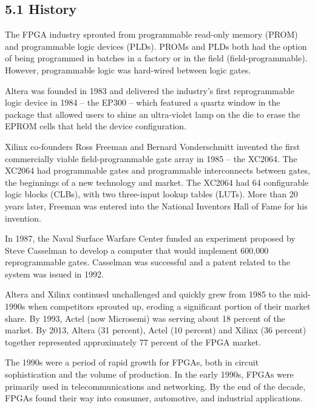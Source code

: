 \subsection*{5.1 History}
The FPGA industry sprouted from programmable read-only memory (PROM) and programmable logic devices (PLDs). PROMs and PLDs both had the option of being programmed in batches in a factory or in the field (field-programmable). However, programmable logic was hard-wired between logic gates.\vspace{.3cm}

Altera was founded in 1983 and delivered the industry's first reprogrammable logic device in 1984 – the EP300 – which featured a quartz window in the package that allowed users to shine an ultra-violet lamp on the die to erase the EPROM cells that held the device configuration.\vspace{.3cm}

Xilinx co-founders Ross Freeman and Bernard Vonderschmitt invented the first commercially viable field-programmable gate array in 1985 – the XC2064. The XC2064 had programmable gates and programmable interconnects between gates, the beginnings of a new technology and market. The XC2064 had 64 configurable logic blocks (CLBs), with two three-input lookup tables (LUTs). More than 20 years later, Freeman was entered into the National Inventors Hall of Fame for his invention.\vspace{.3cm}

In 1987, the Naval Surface Warfare Center funded an experiment proposed by Steve Casselman to develop a computer that would implement 600,000 reprogrammable gates. Casselman was successful and a patent related to the system was issued in 1992.\vspace{.3cm}

Altera and Xilinx continued unchallenged and quickly grew from 1985 to the mid-1990s when competitors sprouted up, eroding a significant portion of their market share. By 1993, Actel (now Microsemi) was serving about 18 percent of the market. By 2013, Altera (31 percent), Actel (10 percent) and Xilinx (36 percent) together represented approximately 77 percent of the FPGA market.\vspace{.3cm}

The 1990s were a period of rapid growth for FPGAs, both in circuit sophistication and the volume of production. In the early 1990s, FPGAs were primarily used in telecommunications and networking. By the end of the decade, FPGAs found their way into consumer, automotive, and industrial applications.\vspace{.3cm}

